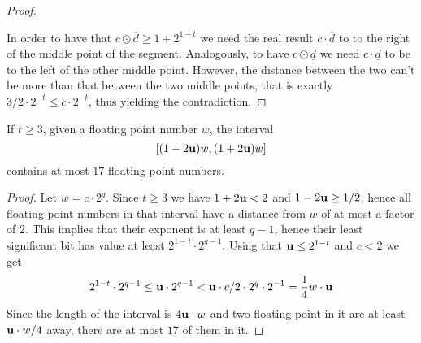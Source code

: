 \begin{proof}
\begin{center}
	\end{center}
	In order to have that $c \odot \overline{d} \ge 1 + 2^{1-t}$ we need the real result $c \cdot \overline{d}$ to to the right of the middle point of the segment. Analogously, to have $c \odot \underline{d}$ we need $c \cdot \underline{d}$ to be to the left of the other middle point. However, the distance between the two can't be more than that between the two middle points, that is exactly $3/2 \cdot 2^{-t} \le c \cdot 2^{-t}$, thus yielding the contradiction.
\end{proof}

\begin{prop}
	If $t \ge 3$, given a floating point number $w$, the interval
	\[
	\left[ (1 - 2 \textbf{u}) w, (1 + 2 \textbf{u}) w \right]
	\]
	contains at most $17$ floating point numbers.
\end{prop}
\begin{proof}
	Let $w = c \cdot 2^q$. Since $t \ge 3$ we have $1 + 2 \textbf{u} < 2$ and $1 - 2 \textbf{u} \ge 1/2$, hence all floating point numbers in that interval have a distance from $w$ of at most a factor of $2$. This implies that their exponent is at least $q - 1$, hence their least significant bit has value at least $2^{1-t} \cdot 2^{q-1}$. Using that $\textbf{u} \le 2^{1-t}$ and $c < 2$ we get
	\[
	2^{1-t} \cdot 2^{q-1} \le \textbf{u} \cdot 2^{q-1} < \textbf{u} \cdot c / 2 \cdot 2^{q} \cdot 2^{-1} = \frac{1}{4} w \cdot \textbf{u}
	\]
	Since the length of the interval is $4\textbf{u} \cdot w$ and two floating point in it are at least $\textbf{u} \cdot w /4$ away, there are at most $17$ of them in it.
\end{proof}